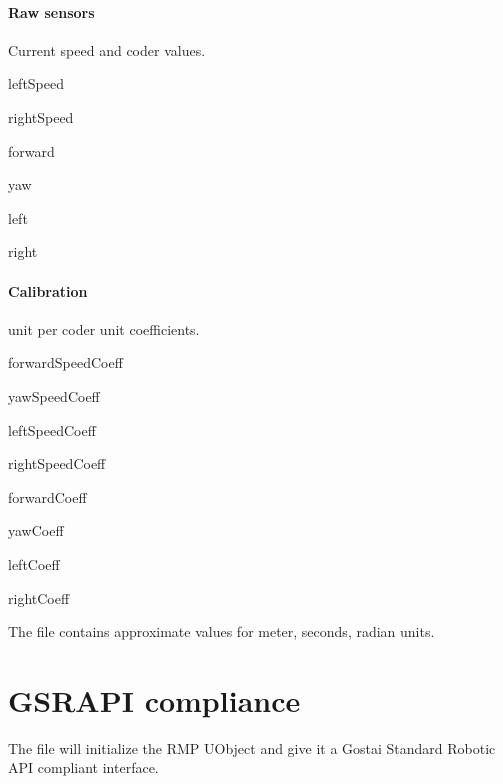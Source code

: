 \paragraph{Raw sensors}
Current speed and coder values.
\begin{urbiscriptapi}
\item[leftSpeed]
\item[rightSpeed]
\item[forward]
\item[yaw]
\item[left]
\item[right]
\end{urbiscriptapi}

\paragraph{Calibration}

\urbi unit per coder unit coefficients.

\begin{urbiscriptapi}
\item[forwardSpeedCoeff]
\item[yawSpeedCoeff]
\item[leftSpeedCoeff]
\item[rightSpeedCoeff]
\item[forwardCoeff]
\item[yawCoeff]
\item[leftCoeff]
\item[rightCoeff]
\end{urbiscriptapi}

The file  contains approximate values for meter, seconds,
radian units.


\section{GSRAPI compliance}

The file  will initialize the RMP UObject and give it a Gostai
Standard Robotic API compliant interface.


